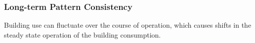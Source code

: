 \subsubsection{Long-term Pattern Consistency}
\label{sec:patternconsistency}

Building use can fluctuate over the course of operation, which causes shifts in the steady state operation of the building consumption.
